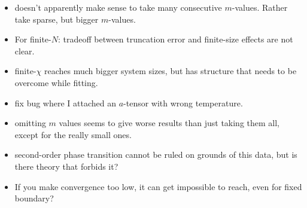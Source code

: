 \begin{itemize}
  \item doesn't apparently make sense to take many consecutive $m$-values. Rather take sparse, but bigger $m$-values.
  \item For finite-$N$: tradeoff between truncation error and finite-size effects are not clear.
  \item finite-$\chi$ reaches much bigger system sizes, but has structure that needs to be overcome while fitting.
  \item fix bug where I attached an $a$-tensor with wrong temperature.
  \item omitting $m$ values seems to give worse results than just taking them all, except for the really small ones.
  \item second-order phase transition cannot be ruled on grounds of this data, but is there theory that forbids it?
  \item If you make convergence too low, it can get impossible to reach, even for fixed boundary?
\end{itemize}
